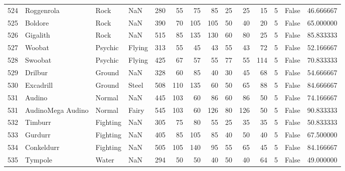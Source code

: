 \begin{tabular}{rlllrrrrrrrrlr}
 524 &                 Roggenrola &      Rock &       NaN &    280 &   55 &      75 &       85 &       25 &       25 &     15 &           5 &      False &   46.666667 \\
 525 &                    Boldore &      Rock &       NaN &    390 &   70 &     105 &      105 &       50 &       40 &     20 &           5 &      False &   65.000000 \\
 526 &                   Gigalith &      Rock &       NaN &    515 &   85 &     135 &      130 &       60 &       80 &     25 &           5 &      False &   85.833333 \\
 527 &                     Woobat &   Psychic &    Flying &    313 &   55 &      45 &       43 &       55 &       43 &     72 &           5 &      False &   52.166667 \\
 528 &                    Swoobat &   Psychic &    Flying &    425 &   67 &      57 &       55 &       77 &       55 &    114 &           5 &      False &   70.833333 \\
 529 &                    Drilbur &    Ground &       NaN &    328 &   60 &      85 &       40 &       30 &       45 &     68 &           5 &      False &   54.666667 \\
 530 &                  Excadrill &    Ground &     Steel &    508 &  110 &     135 &       60 &       50 &       65 &     88 &           5 &      False &   84.666667 \\
 531 &                     Audino &    Normal &       NaN &    445 &  103 &      60 &       86 &       60 &       86 &     50 &           5 &      False &   74.166667 \\
 531 &          AudinoMega Audino &    Normal &     Fairy &    545 &  103 &      60 &      126 &       80 &      126 &     50 &           5 &      False &   90.833333 \\
 532 &                    Timburr &  Fighting &       NaN &    305 &   75 &      80 &       55 &       25 &       35 &     35 &           5 &      False &   50.833333 \\
 533 &                    Gurdurr &  Fighting &       NaN &    405 &   85 &     105 &       85 &       40 &       50 &     40 &           5 &      False &   67.500000 \\
 534 &                 Conkeldurr &  Fighting &       NaN &    505 &  105 &     140 &       95 &       55 &       65 &     45 &           5 &      False &   84.166667 \\
 535 &                    Tympole &     Water &       NaN &    294 &   50 &      50 &       40 &       50 &       40 &     64 &           5 &      False &   49.000000 \\

\end{tabular}
